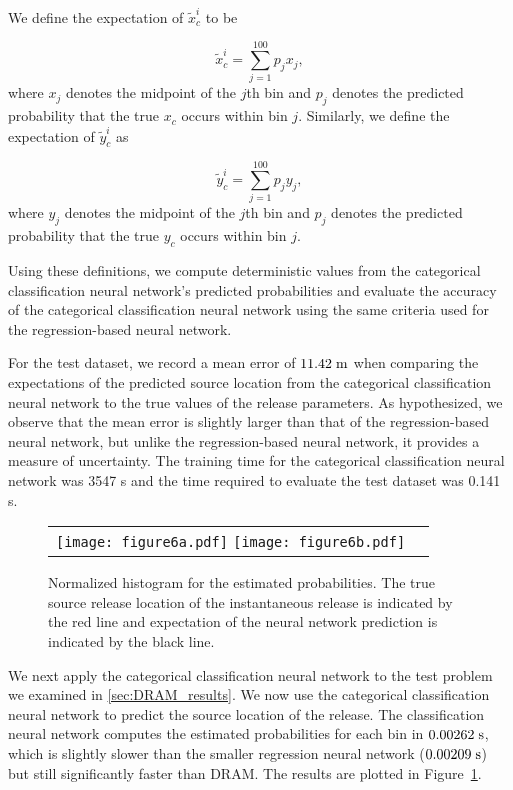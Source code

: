 \documentclass[sn-mathphys-ay]{sn-jnl}
\begin{document}
 We define the expectation of $\tilde{x}_c^i$ to be
 
\begin{equation}
\label{eq:x_c}
\tilde{x}_c^i= \sum_{j=1}^{100} p_j x_j,
\end{equation} 
where $x_j$ denotes the midpoint of the $j$th bin and $p_j$ denotes the predicted probability that the true $x_c$ occurs within bin $j$. Similarly, we define the expectation of $\tilde{y}_c^i$ as

\begin{equation}
\label{eq:y_c}
\tilde{y}_c^i= \sum_{j=1}^{100} p_j y_j,
\end{equation} 
where $y_j$ denotes the midpoint of the $j$th bin and $p_j$ denotes the predicted probability that the true $y_c$ occurs within bin $j$.

Using these definitions, we compute deterministic values from the categorical classification neural network's predicted probabilities and evaluate the accuracy of the categorical classification neural network using the same criteria used for the regression-based neural network. 

For the test dataset, we record a mean error of $11.42 \hspace{1mm} \text{m}$ when comparing the expectations of the predicted source location from the categorical classification neural network to the true values of the release parameters. As hypothesized, we observe that the mean error is slightly larger than that of the regression-based neural network, but unlike the regression-based neural network, it provides a measure of uncertainty. The training time for the categorical classification neural network was 3547 s and the time required to evaluate the test dataset was 0.141 s.

 \begin{figure}[b]
    \centering
    \begin{tabular}{c c}
    \texttt{[image: figure6a.pdf]}
    \texttt{[image: figure6b.pdf]}
    \end{tabular}
     \caption{Normalized histogram for the estimated probabilities. The true source release location of the instantaneous release is indicated by the red line and expectation of the neural network prediction is indicated by the black line.}
         \label{fig:prob_x_c}
 \end{figure}

We next apply the categorical classification neural network to the test problem we examined in \ref{sec:DRAM_results}. We now use the categorical classification neural network to predict the source location of the release. The classification neural network computes the estimated probabilities for each bin in $0.00262 \hspace{1mm} \text{s}$, which is slightly slower than the smaller regression neural network ($0.00209 \hspace{1mm} \text{s}$) but still significantly faster than DRAM. The results are plotted in 
Figure~\ref{fig:prob_x_c}.
\end{document}
